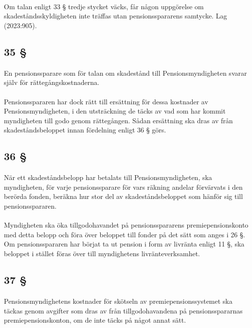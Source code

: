 \documentclass[a4paper,notitlepage,openany,10pt]{book}
\begin{document}
\paragraph*{}
Om talan enligt 33 § tredje stycket väcks, får någon uppgörelse om skadeståndsskyldigheten inte träffas utan pensionsspararens samtycke.
Lag (2023:905).
\subsection*{35 §}
\paragraph*{}
En pensionssparare som för talan om skadestånd till Pensionsmyndigheten svarar själv för rättegångskostnaderna.
\paragraph*{}
Pensionsspararen har dock rätt till ersättning för dessa kostnader av Pensionsmyndigheten, i den utsträckning de täcks av vad som har kommit myndigheten till godo genom rättegången. Sådan ersättning ska dras av från skadeståndsbeloppet innan fördelning enligt 36 § görs.
\subsection*{36 §}
\paragraph*{}
När ett skadeståndsbelopp har betalats till Pensionsmyndigheten, ska myndigheten, för varje pensionssparare för vars räkning andelar förvärvats i den berörda fonden, beräkna hur stor del av skadeståndsbeloppet som hänför sig till pensionsspararen.
\paragraph*{}
Myndigheten ska öka tillgodohavandet på pensionsspararens premiepensionskonto med detta belopp och föra över beloppet till fonder på det sätt som anges i 26 §. Om pensionsspararen har börjat ta ut pension i form av livränta enligt 11 §, ska beloppet i stället föras över till myndighetens livränteverksamhet.
\subsection*{37 §}
\paragraph*{}
Pensionsmyndighetens kostnader för skötseln av premiepensionssystemet ska täckas genom avgifter som dras av från tillgodohavandena på pensionsspararnas premiepensionskonton, om de inte täcks på något annat sätt.
\end{document}
